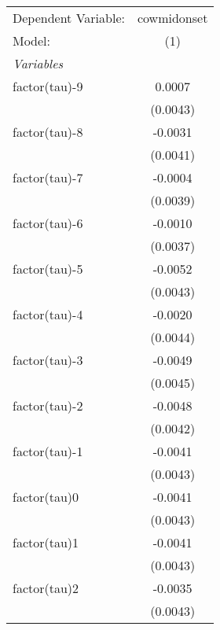 \par\endgroup



\begingroup
\centering
\begin{tabular}{lc}
   \tabularnewline \midrule \midrule
   Dependent Variable:             & cowmidonset\\  
   Model:                          & (1)\\  
   \midrule
   \emph{Variables}\\
   factor(tau)-9                   & 0.0007\\   
                                   & (0.0043)\\   
   factor(tau)-8                   & -0.0031\\   
                                   & (0.0041)\\   
   factor(tau)-7                   & -0.0004\\   
                                   & (0.0039)\\   
   factor(tau)-6                   & -0.0010\\   
                                   & (0.0037)\\   
   factor(tau)-5                   & -0.0052\\   
                                   & (0.0043)\\   
   factor(tau)-4                   & -0.0020\\   
                                   & (0.0044)\\   
   factor(tau)-3                   & -0.0049\\   
                                   & (0.0045)\\   
   factor(tau)-2                   & -0.0048\\   
                                   & (0.0042)\\   
   factor(tau)-1                   & -0.0041\\   
                                   & (0.0043)\\   
   factor(tau)0                    & -0.0041\\   
                                   & (0.0043)\\   
   factor(tau)1                    & -0.0041\\   
                                   & (0.0043)\\   
   factor(tau)2                    & -0.0035\\   
                                   & (0.0043)\\   

\end{tabular}
